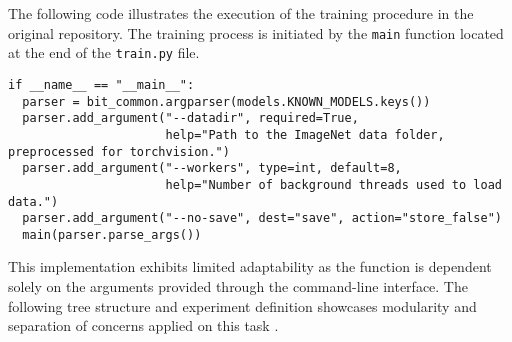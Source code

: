 The following code illustrates the execution of the training procedure in the original repository. The training process is initiated by the \texttt{main} function located at the end of the \texttt{train.py} file. 
\begin{verbatim}
if __name__ == "__main__":
  parser = bit_common.argparser(models.KNOWN_MODELS.keys())
  parser.add_argument("--datadir", required=True,
                      help="Path to the ImageNet data folder, preprocessed for torchvision.")
  parser.add_argument("--workers", type=int, default=8,
                      help="Number of background threads used to load data.")
  parser.add_argument("--no-save", dest="save", action="store_false")
  main(parser.parse_args())
\end{verbatim}

This implementation exhibits limited adaptability as the function is dependent solely on the arguments provided through the command-line interface. The following tree structure and experiment definition showcases modularity and separation of concerns applied on this task .

\vspace{0.5em}

